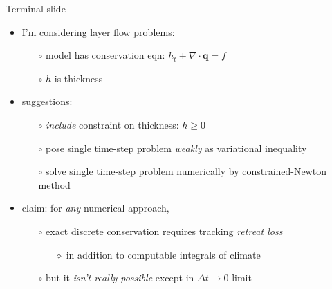 \documentclass{beamer}
\newcommand\bq{\mathbf{q}}
\newcommand{\Div}{\nabla\cdot}
\begin{document}
\begin{frame}{Terminal slide}

  \begin{itemize}
  \item I'm considering layer flow problems:
    \begin{itemize}
    \item[$\circ$]  model has conservation eqn: $h_t + \Div\bq = f$
    \item[$\circ$]  $h$ is thickness
    \end{itemize}
  \item suggestions:
    \begin{itemize}
    \item[$\circ$]  \emph{include} constraint on thickness: $h\ge 0$
    \item[$\circ$]  pose single time-step problem \emph{weakly} as variational inequality
    \item[$\circ$]  solve single time-step problem numerically by constrained-Newton method
    \end{itemize}
  \item claim:  for \emph{any} numerical approach,
    \begin{itemize}
    \item[$\circ$]  exact discrete conservation requires tracking \emph{retreat loss}
      \begin{itemize}
      \item[$\diamond$] in addition to computable integrals of climate
      \end{itemize}
    \item[$\circ$]  but it \emph{isn't really possible} except in $\Delta t\to 0$ limit
    \end{itemize}
  \end{itemize}
\end{frame}
\end{document}
